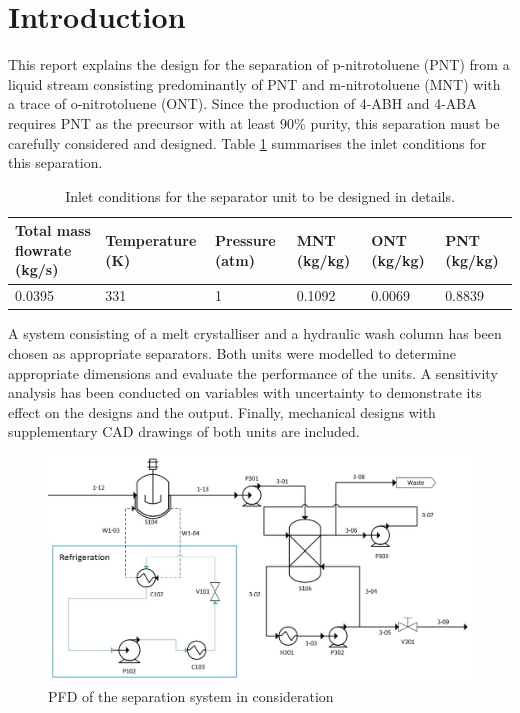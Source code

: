 \section{Introduction}

This report explains the design for the separation of p-nitrotoluene (PNT) from a liquid stream consisting predominantly of PNT and m-nitrotoluene (MNT) with a trace of o-nitrotoluene (ONT). Since the production of 4-ABH and 4-ABA requires PNT as the precursor with at least 90\% purity, this separation must be carefully considered and designed. Table \ref{tab:inlet crystalliser} summarises the inlet conditions for this separation. 

\begin{table}[h] \label{tab:inlet crystalliser}
\centering
\caption{Inlet conditions for the separator unit to be designed in details.}
\begin{tabular}{@{}l|l|l|l|l|l@{}}
\toprule
\textbf{Total mass flowrate (kg/s)}  & \textbf{Temperature (K)}  & \textbf{Pressure (atm)} & \textbf{MNT (kg/kg)} & \textbf{ONT (kg/kg)} & \textbf{PNT (kg/kg)}   \\ \midrule
0.0395  & 331 &  1 & 0.1092 & 0.0069  &   0.8839 \\ \bottomrule
\end{tabular}
\end{table}

A system consisting of a melt crystalliser and a hydraulic wash column has been chosen as appropriate separators. Both units were modelled to determine appropriate dimensions and evaluate the performance of the units. A sensitivity analysis has been conducted on variables with uncertainty to demonstrate its effect on the designs and the output. Finally, mechanical designs with supplementary CAD drawings of both units are included.


\begin{figure}[h]
    \centering
    \includegraphics[scale=0.5]{chapters/3-separation/figures/Crystallizer PFD.jpg}
    \caption{PFD of the separation system in consideration}
    \label{fig:crystalliser schematic}
\end{figure}

